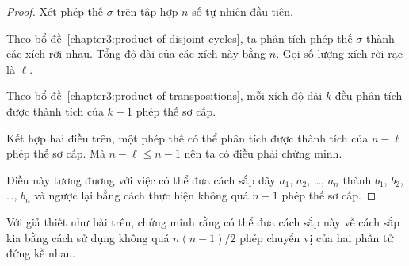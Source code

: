 \documentclass[class=nhvh-linear-algebra,crop=false]{standalone}
\begin{document}
\begin{proof}
    \par Xét phép thế $\sigma$ trên tập hợp $n$ số tự nhiên đầu tiên.
    \par Theo bổ đề~\ref{chapter3:product-of-disjoint-cycles}, ta phân tích phép thế $\sigma$ thành các xích rời nhau. Tổng độ dài của các xích này bằng $n$. Gọi số lượng xích rời rạc là $\ell$.
    \par Theo bổ đề~\ref{chapter3:product-of-transpositions}, mỗi xích độ dài $k$ đều phân tích được thành tích của $k-1$ phép thế sơ cấp.
    \par Kết hợp hai điều trên, một phép thế có thể phân tích được thành tích của $n - \ell$ phép thế sơ cấp. Mà $n - \ell \le n - 1$ nên ta có điều phải chứng minh.
    \par Điều này tương đương với việc có thể đưa cách sắp dãy $a_{1}$, $a_{2}$, \ldots, $a_{n}$ thành $b_{1}$, $b_{2}$, \ldots, $b_{n}$ và ngược lại bằng cách thực hiện không quá $n - 1$ phép thế sơ cấp.
\end{proof}

\begin{exercise}
    Với giả thiết như bài trên, chứng minh rằng có thể đưa cách sắp này về cách sắp kia bằng cách sử dụng không quá $n(n-1)/2$ phép chuyển vị của hai phần tử đứng kề nhau.
\end{exercise}
\end{document}
